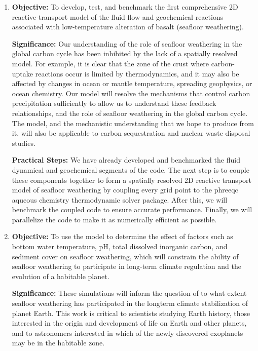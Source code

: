 \documentclass[authoryear,round,12pt]{article}
\begin{document}
\begin{enumerate}

\item \textbf{Objective:} To develop, test, and benchmark the first
  comprehensive 2D reactive-transport model of the fluid flow and
  geochemical reactions associated with low-temperature alteration of
  basalt (seafloor weathering).

  \textbf{Significance:} Our understanding of the role of seafloor
  weathering in the global carbon cycle has been inhibited by the lack
  of a spatially resolved model. For example, it is clear that the zone of the crust where carbon-uptake reactions
  occur is limited by thermodynamics, and it may also be affected by 
changes in ocean or mantle temperature, spreading geophysics, or ocean chemistry. 
Our model will resolve the mechanisms that control carbon precipitation sufficiently to allow us to understand these 
feedback relationships, and the role of seafloor weathering in the global carbon cycle.  
The model, and the mechanistic understanding that we hope to produce from it, will also be applicable to 
carbon sequestration and nuclear waste disposal studies.

  \textbf{Practical Steps:} We have already developed and benchmarked
  the fluid dynamical and geochemical segments of the code. The next
  step is to couple these components together to form a spatially
  resolved 2D reactive transport model of seafloor weathering by coupling every grid point to the 
phreeqc aqueous chemistry thermodynamic solver package. After
  this, we will benchmark the coupled code to ensure accurate
  performance. Finally, we will parallelize the code to make it as
  numerically efficient as possible.

\item \textbf{Objective:} To use the model to determine the effect of
  factors such as bottom water temperature, pH, total dissolved
  inorganic carbon, and sediment cover on seafloor weathering, which will
  constrain the ability of seafloor weathering to participate in
  long-term climate regulation and the evolution of a habitable
  planet.

  \textbf{Significance:} These simulations will inform the question
  of to what extent seafloor weathering has participated in the
  longterm climate stabilization of planet Earth. This work is
  critical to scientists studying Earth history, those interested in
  the origin and development of life on Earth and other planets, and
  to astronomers interested in which of the newly discovered
  exoplanets may be in the habitable zone.


\end{enumerate}
\end{document}

